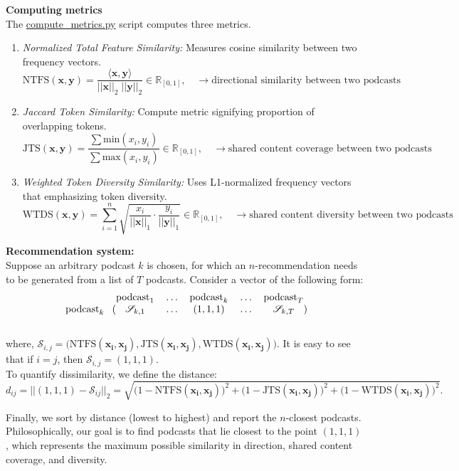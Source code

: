 \documentclass{article}
\begin{document}
\noindent \textbf{Computing metrics}\\

\noindent The \href{https://github.com/Stochastic1017/Spotify-Podcast-Clustering/blob/main/models/compute_metrics.py}{compute\_metrics.py} script computes three metrics.

\begin{enumerate}
    \item \textit{Normalized Total Feature Similarity:} Measures cosine similarity between two frequency vectors.
    $$\text{NTFS}(\bm{x},\bm{y}) = \frac{\langle \bm{x}, \bm{y}\rangle}{||\bm{x}||_{2}\;||\bm{y}||_{2}} \in \mathbb{R}_{[0,1]}, \quad \longrightarrow \text{directional similarity between two podcasts}$$
    \item \textit{Jaccard Token Similarity:} Compute metric signifying proportion of overlapping tokens.
    $$\text{JTS}(\bm{x},\bm{y}) = \frac{\sum \text{min}(x_i, y_i)}{\sum \text{max}(x_i, y_i)} \in \mathbb{R}_{[0,1]}, \quad \longrightarrow \text{shared content coverage between two podcasts}$$
    \item \textit{Weighted Token Diversity Similarity:} Uses L1-normalized frequency vectors that emphasizing token diversity.
    $$ \text{WTDS}(\bm{x},\bm{y}) = \sum_{i=1}^{n} \sqrt{ \frac{x_i}{||\bm{x}||_{1}} \cdot \frac{y_i}{||\bm{y}||_{1}} } \in \mathbb{R}_{[0,1]}, \quad \longrightarrow \text{shared content diversity between two podcasts}$$
\end{enumerate}


\noindent \textbf{Recommendation system:}\\

\noindent Suppose an arbitrary podcast $k$ is chosen, for which an $n$-recommendation needs to be generated from a list of $T$ podcasts. Consider a vector of the following form:
\[
\begin{blockarray}{cccccc}
    & \text{podcast}_1 & \dots & \text{podcast}_k & \dots & \text{podcast}_T \\
    \begin{block}{c(ccccc)}
    \text{podcast}_k & \mathcal{S}_{k,1} & \dots & (1, 1, 1) & \dots & \mathcal{S}_{k,T} \\
    \end{block}
\end{blockarray}
\]

\noindent where, $\mathcal{S}_{i,j} = \big(\text{NTFS}(\bm{x_i}, \bm{x_j}), \text{JTS}(\bm{x_i}, \bm{x_j}), \text{WTDS}(\bm{x_i}, \bm{x_j}) \big)$. It is easy to see that if $i = j$, then $\mathcal{S}_{i,j} = (1,1,1)$.\\

\noindent To quantify dissimilarity, we define the distance:
$$ d_{ij} = ||(1,1,1) - \mathcal{S}_{ij}||_2 = \sqrt{\big(1 - \text{NTFS}(\bm{x_i}, \bm{x_j})\big)^2 + \big(1 - \text{JTS}(\bm{x_i}, \bm{x_j})\big)^2 + \big(1 - \text{WTDS}(\bm{x_i}, \bm{x_j})\big)^2}.$$

\noindent Finally, we sort by distance (lowest to highest) and report the $n$-closest podcasts. Philosophically, our goal is to find podcasts that lie closest to the point $(1,1,1)$, which represents the maximum possible similarity in direction, shared content coverage, and diversity.
\end{document}
